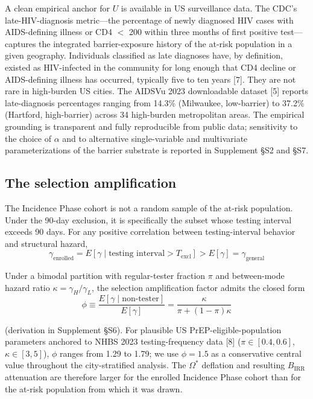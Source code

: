 \documentclass[12pt]{article}
\begin{document}
A clean empirical anchor for $U$ is available in US surveillance data. The CDC's late-HIV-diagnosis metric---the percentage of newly diagnosed HIV cases with AIDS-defining illness or CD4 $<$ 200 within three months of first positive test---captures the integrated barrier-exposure history of the at-risk population in a given geography. Individuals classified as late diagnoses have, by definition, existed as HIV-infected in the community for long enough that CD4 decline or AIDS-defining illness has occurred, typically five to ten years [7]. They are not rare in high-burden US cities. The AIDSVu 2023 downloadable dataset [5] reports late-diagnosis percentages ranging from 14.3\% (Milwaukee, low-barrier) to 37.2\% (Hartford, high-barrier) across 34 high-burden metropolitan areas. The empirical grounding is transparent and fully reproducible from public data; sensitivity to the choice of $\alpha$ and to alternative single-variable and multivariate parameterizations of the barrier substrate is reported in Supplement \S S2 and \S S7.

\subsection{The selection amplification}

The Incidence Phase cohort is not a random sample of the at-risk population. Under the 90-day exclusion, it is specifically the subset whose testing interval exceeds 90 days. For any positive correlation between testing-interval behavior and structural hazard,
\begin{equation}
\gamma_{\mathrm{enrolled}} = E[\gamma \mid \text{testing interval} > T_{\mathrm{excl}}] > E[\gamma] = \gamma_{\mathrm{general}}
\end{equation}

Under a bimodal partition with regular-tester fraction $\pi$ and between-mode hazard ratio $\kappa = \gamma_H / \gamma_L$, the selection amplification factor admits the closed form
\begin{equation}
\phi \equiv \frac{E[\gamma \mid \text{non-tester}]}{E[\gamma]} = \frac{\kappa}{\pi + (1 - \pi)\kappa}
\end{equation}

(derivation in Supplement \S S6). For plausible US PrEP-eligible-population parameters anchored to NHBS 2023 testing-frequency data [8] ($\pi \in [0.4, 0.6]$, $\kappa \in [3, 5]$), $\phi$ ranges from 1.29 to 1.79; we use $\phi = 1.5$ as a conservative central value throughout the city-stratified analysis. The $\Omega^*$ deflation and resulting $B_{\mathrm{IRR}}$ attenuation are therefore larger for the enrolled Incidence Phase cohort than for the at-risk population from which it was drawn.
\end{document}
